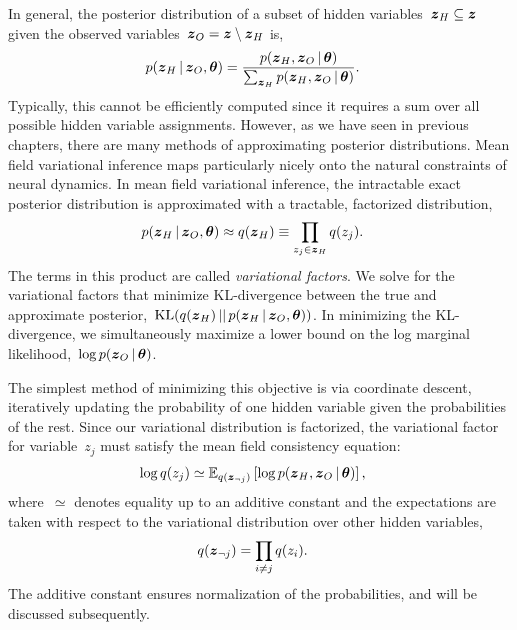 In general, the posterior distribution of a subset of hidden
variables~$\boldsymbol{z}_H \subseteq \boldsymbol{z}$ 
given the observed variables~$\boldsymbol{z}_O = \boldsymbol{z} \setminus \boldsymbol{z}_H$ is,
\begin{align*}
  p(\boldsymbol{z}_H \,|\, \boldsymbol{z}_O, \boldsymbol{\theta}) &=
  \frac{p(\boldsymbol{z}_H, \boldsymbol{z}_O \,|\, \boldsymbol{\theta})}
       {\sum_{\boldsymbol{z}_H} p(\boldsymbol{z}_H, \boldsymbol{z}_O \,|\, \boldsymbol{\theta})}.
\end{align*}
Typically, this cannot be efficiently computed since it requires a sum
over all possible hidden variable assignments.  However, as we have
seen in previous chapters, there are many methods of approximating
posterior distributions. Mean field variational inference maps
particularly nicely onto the natural constraints of neural dynamics.
In mean field variational inference, the intractable exact
posterior distribution is approximated with a tractable, factorized distribution,
\begin{align*}
  p(\boldsymbol{z}_H \,|\, \boldsymbol{z}_O, \boldsymbol{\theta}) &\approx q(\boldsymbol{z}_H) \equiv \prod_{z_j \in \boldsymbol{z}_H} q(z_j).
\end{align*}
The terms in this product are called \emph{variational factors}.  We
solve for the variational factors that minimize KL-divergence between
the true and approximate posterior,~$\mathrm{KL}(q(\boldsymbol{z}_H) \,||\, p(\boldsymbol{z}_H
\,|\, \boldsymbol{z}_O, \boldsymbol{\theta}))$. In minimizing the KL-divergence, we
simultaneously maximize a lower bound on the log marginal
likelihood,~$\log p(\boldsymbol{z}_O \,|\, \boldsymbol{\theta})$.

The simplest method of minimizing this objective is via coordinate
descent, iteratively updating the probability of one hidden variable
given the probabilities of the rest. Since our variational
distribution is factorized, the variational factor for variable~$z_j$
must satisfy the mean field consistency equation:
\begin{align}
  \label{eq:mf_consistency}
  \log q(z_j) &\simeq \mathbb{E}_{q(\boldsymbol{z}_{\neg j})}
  \left[ \log p(\boldsymbol{z}_H, \boldsymbol{z}_O \,|\, \boldsymbol{\theta}) \right],
\end{align}
where~$\simeq$ denotes equality up to an additive constant and the
expectations are taken with respect to the variational
distribution over other hidden variables,
\begin{align*}
  q(\boldsymbol{z}_{\neg j}) &= \prod_{i \neq j} q(z_{i}).
\end{align*}
The additive constant
ensures normalization of the probabilities, and will be discussed
subsequently.  


